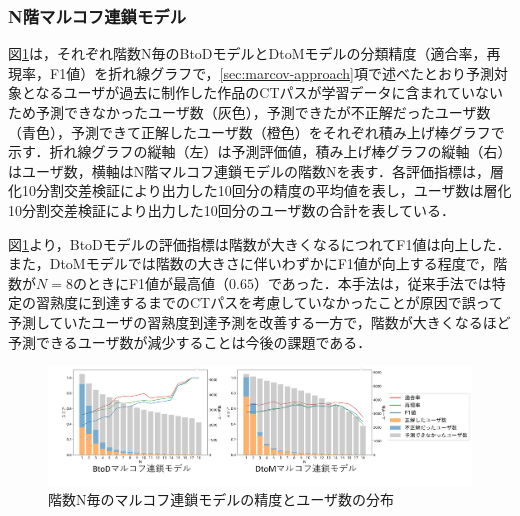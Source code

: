\documentclass[submit]{ipsj}
\newcommand{\todo}[1]{\colorbox{yellow}{{\bf TODO}:}{\color{red} {\textbf{[#1]}}}}
\begin{document}



\subsubsection{N階マルコフ連鎖モデル}\label{sec:markovResult}

図\ref{fig:markov-btod}は，それぞれ階数N毎のBtoDモデルとDtoMモデルの分類精度（適合率，再現率，F1値）を折れ線グラフで，\ref{sec:marcov-approach}項で述べたとおり予測対象となるユーザが過去に制作した作品のCTパスが学習データに含まれていないため予測できなかったユーザ数（灰色），予測できたが不正解だったユーザ数（青色），予測できて正解したユーザ数（橙色）をそれぞれ積み上げ棒グラフで示す．折れ線グラフの縦軸（左）は予測評価値，積み上げ棒グラフの縦軸（右）はユーザ数，横軸はN階マルコフ連鎖モデルの階数Nを表す．各評価指標は，層化10分割交差検証により出力した10回分の精度の平均値を表し，ユーザ数は層化10分割交差検証により出力した10回分のユーザ数の合計を表している．

図\ref{fig:markov-btod}より，BtoDモデルの評価指標は階数が大きくなるにつれてF1値は向上した．また，DtoMモデルでは階数の大きさに伴いわずかにF1値が向上する程度で，階数が$N=8$のときにF1値が最高値（$0.65$）であった．本手法は，従来手法では特定の習熟度に到達するまでのCTパスを考慮していなかったことが原因で誤って予測していたユーザの習熟度到達予測を改善する一方で，階数が大きくなるほど予測できるユーザ数が減少することは今後の課題である．


\begin{figure}[t]
	\centering
	\includegraphics[width=0.9\linewidth]{Okamoto_fig/markov-result.pdf}
        \vspace{-5mm}
	\caption{階数N毎のマルコフ連鎖モデルの精度とユーザ数の分布}
	\label{fig:markov-btod}
 \vspace{-4mm}
\end{figure}
\end{document}

